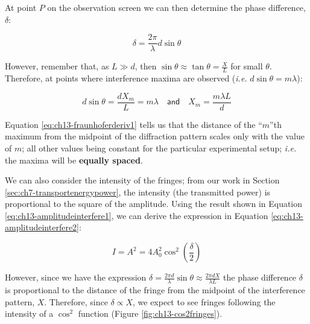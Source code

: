 \documentclass[
]{book}
\begin{document}
At point \(P\) on the observation screen we can then determine the phase difference, \(\delta\):

\begin{equation}
\delta = \frac{2\pi}{\lambda}d\sin\theta
\end{equation}

However, remember that, as \(L \gg d\), then \(\sin \theta \approx \tan \theta = \frac{X}{L}\) for small \(\theta\). Therefore, at points where interference maxima are observed (\emph{i.e.} \(d\sin\theta = m\lambda\)):

\begin{equation}
d\sin\theta = \frac{d X_m}{L}= m\lambda \quad \textsf{and} \quad X_m = \frac{m\lambda L}{d}
\label{eq:ch13-fraunhoferderiv1}
\end{equation}

Equation \eqref{eq:ch13-fraunhoferderiv1} tells us that the distance of the ``\(m\)''th maximum from the midpoint of the diffraction pattern scales only with the value of \(m\); all other values being constant for the particular experimental setup; \emph{i.e.} the maxima will be \textbf{equally spaced}.

We can also consider the intensity of the fringes; from our work in Section \ref{sec:ch7-transportenergypower}, the intensity (the transmitted power) is proportional to the square of the amplitude. Using the result shown in Equation \eqref{eq:ch13-amplitudeinterfere1}, we can derive the expression in Equation \eqref{eq:ch13-amplitudeinterfere2}:

\begin{equation}
I = A^2 = 4 A_0^2 \cos^2 \left(\frac{\delta}{2}\right)
\label{eq:ch13-amplitudeinterfere2}
\end{equation}

However, since we have the expression \(\delta = \frac{2\pi d}{\lambda}\sin\theta \approx \frac{2\pi d X}{\lambda L}\) the phase difference \(\delta\) is proportional to the distance of the fringe from the midpoint of the interference pattern, \(X\). Therefore, since \(\delta \propto X\), we expect to see fringes following the intensity of a \(\cos^2\) function (Figure \ref{fig:ch13-cos2fringes}).
\end{document}
